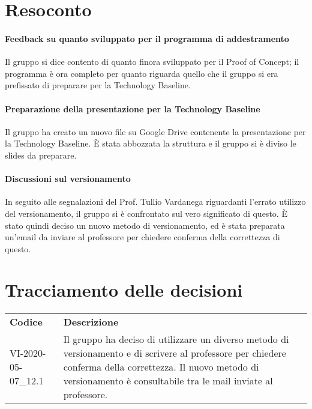 \documentclass{article}
\begin{document}
\section{Resoconto}%
\label{resoconto}
\paragraph*{Feedback su quanto sviluppato per il programma di addestramento}
Il gruppo si dice contento di quanto finora sviluppato per il Proof of Concept; il programma è ora completo per quanto riguarda quello che il gruppo si era prefissato di preparare per la Technology Baseline.

\paragraph*{Preparazione della presentazione per la Technology Baseline}
Il gruppo ha creato un nuovo file su Google Drive contenente la presentazione per la Technology Baseline. È stata abbozzata la struttura e il gruppo si è diviso le slides da preparare.

\paragraph*{Discussioni sul versionamento}
In seguito alle segnalazioni del Prof. Tullio Vardanega riguardanti l'errato utilizzo del versionamento, il gruppo si è confrontato sul vero significato di questo. È stato quindi deciso un nuovo metodo di versionamento, ed è stata preparata un'email da inviare al professore per chiedere conferma della correttezza di questo.

\section{Tracciamento delle decisioni}
\begin{table}[H]
  \centering
  \begin{tabular}{p{4cm}|p{12cm}}
    \rowcolor{lightgray}
    \textbf{Codice}  & \textbf{Descrizione}      \\
     VI-2020-05-07\_12.1 & Il gruppo ha deciso di utilizzare un diverso metodo di versionamento e di scrivere al professore per chiedere conferma della correttezza. Il nuovo metodo di versionamento è consultabile tra le mail inviate al professore. \\
  \end{tabular}
\end{table}
\end{document}
